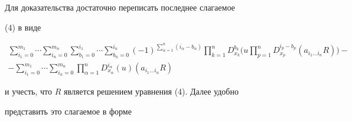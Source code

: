  


Для доказательства достаточно переписать последнее слагаемое 


(4) в виде 


\begin{multline*} 


\sum^{m_1}_{i_1=0}\dotsb\sum^{m_n}_{i_n=0} 


\sum^{i_1}_{b_1=0}\dotsb\sum^{i_n}_{b_n=0} 


(-1)^{\sum\limits^n_{\alpha=1}(i_\alpha-b_\alpha)} 


\prod^n_{k=1}D^{b_k}_{x_k}\bigg(u\prod^n_{p=1} 


D^{i_p-b_p}_{x_p}(a_{i_1\dotsc i_n}R)\bigg)- \\ 


% 


-\sum^{m_1}_{i_1=0}\dotsb\sum^{m_n}_{i_n=0}\prod^n_{\alpha=1} 


D^{i_\alpha}_{x_\alpha}(u)(a_{i_1\dotsc i_n}R) 


\end{multline*} 


и учесть, что $R$ является решением уравнения (4). Далее удобно 


представить это слагаемое в форме 


